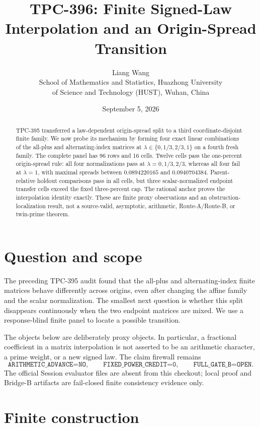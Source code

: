 \documentclass[10pt]{article}
\title{TPC-396: Finite Signed-Law Interpolation and an Origin-Spread Transition}
\author{Liang Wang\\
School of Mathematics and Statistics, Huazhong University\\
of Science and Technology (HUST), Wuhan, China}
\date{September 5, 2026}
\begin{document}
\maketitle

\begin{abstract}
TPC-395 transferred a law-dependent origin-spread split to a third
coordinate-disjoint finite family.  We now probe its mechanism by forming four
exact linear combinations of the all-plus and alternating-index matrices at
$\lambda\in\{0,1/3,2/3,1\}$ on a fourth fresh family.  The complete panel has
96 rows and 16 cells.  Twelve cells pass the one-percent origin-spread rule:
all four normalizations pass at $\lambda=0,1/3,2/3$, whereas all four fail at
$\lambda=1$, with maximal spreads between $0.0894220165$ and
$0.0940704384$.  Parent-relative holdout comparisons pass in all cells, but
three scalar-normalized endpoint transfer cells exceed the fixed three-percent
cap.  The rational anchor proves the interpolation identity exactly.  These
are finite proxy observations and an obstruction-localization result, not a
source-valid, asymptotic, arithmetic, Route-A/Route-B, or twin-prime theorem.
\end{abstract}

\section{Question and scope}

The preceding TPC-395 audit found that the all-plus and alternating-index
finite matrices behave differently across origins, even after changing the
affine family and the scalar normalization.  The smallest next question is
whether this split disappears continuously when the two endpoint matrices are
mixed.  We use a response-blind finite panel to locate a possible transition.

The objects below are deliberately proxy objects.  In particular, a fractional
coefficient in a matrix interpolation is not asserted to be an arithmetic
character, a prime weight, or a new signed law.  The claim firewall remains
\[
 \texttt{ARITHMETIC\_ADVANCE=NO},\qquad
 \texttt{FIXED\_POWER\_CREDIT=0},\qquad
 \texttt{FULL\_GATE\_B=OPEN}.
\]
The official Session evaluator files are absent from this checkout; local
proof and Bridge-B artifacts are fail-closed finite consistency evidence only.

\section{Finite construction}
\end{document}
